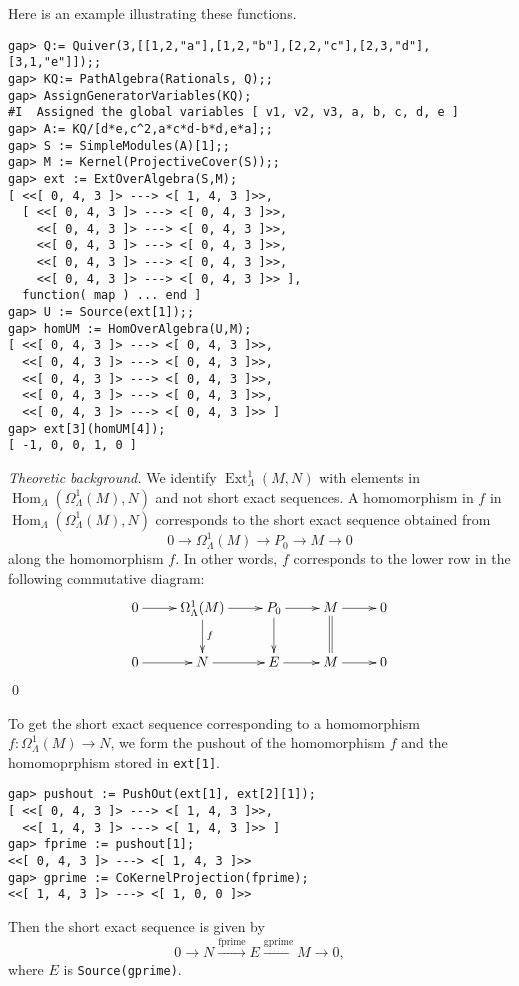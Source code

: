 \documentclass{amsart}
\newcommand{\Hom}{\operatorname{Hom}\nolimits}
\newcommand{\Ext}{\operatorname{Ext}\nolimits}
\theoremstyle{definition}
\newcommand{\code}[1]{\texttt{#1}}
\theoremstyle{theoretic}
\newenvironment{theoback}
{\medskip\small\textit{Theoretic background.} }
{\qed\par\medskip}
\begin{document}
Here is an example illustrating these functions.

\begin{verbatim}
gap> Q:= Quiver(3,[[1,2,"a"],[1,2,"b"],[2,2,"c"],[2,3,"d"],
[3,1,"e"]]);;
gap> KQ:= PathAlgebra(Rationals, Q);;
gap> AssignGeneratorVariables(KQ);
#I  Assigned the global variables [ v1, v2, v3, a, b, c, d, e ]
gap> A:= KQ/[d*e,c^2,a*c*d-b*d,e*a];;
gap> S := SimpleModules(A)[1];;
gap> M := Kernel(ProjectiveCover(S));;
gap> ext := ExtOverAlgebra(S,M);
[ <<[ 0, 4, 3 ]> ---> <[ 1, 4, 3 ]>>, 
  [ <<[ 0, 4, 3 ]> ---> <[ 0, 4, 3 ]>>,
    <<[ 0, 4, 3 ]> ---> <[ 0, 4, 3 ]>>, 
    <<[ 0, 4, 3 ]> ---> <[ 0, 4, 3 ]>>,
    <<[ 0, 4, 3 ]> ---> <[ 0, 4, 3 ]>>, 
    <<[ 0, 4, 3 ]> ---> <[ 0, 4, 3 ]>> ],
  function( map ) ... end ]
gap> U := Source(ext[1]);;
gap> homUM := HomOverAlgebra(U,M);
[ <<[ 0, 4, 3 ]> ---> <[ 0, 4, 3 ]>>,
  <<[ 0, 4, 3 ]> ---> <[ 0, 4, 3 ]>>, 
  <<[ 0, 4, 3 ]> ---> <[ 0, 4, 3 ]>>,
  <<[ 0, 4, 3 ]> ---> <[ 0, 4, 3 ]>>, 
  <<[ 0, 4, 3 ]> ---> <[ 0, 4, 3 ]>> ]
gap> ext[3](homUM[4]);
[ -1, 0, 0, 1, 0 ]
\end{verbatim}

\begin{theoback}
We identify $\Ext^1_\Lambda(M,N)$ with elements in
$\Hom_\Lambda(\Omega^1_\Lambda(M),N)$ and not short exact sequences.
A homomorphism in $f$ in $\Hom_\Lambda(\Omega^1_\Lambda(M),N)$
corresponds to the short exact sequence obtained from 
\[0\to \Omega^1_\Lambda(M)\to P_0 \to M\to 0\]
along the homomorphism $f$.  In other words, $f$ corresponds to the
lower row in the following commutative diagram:
\[\xymatrix{
0\ar[r] & \Omega^1_\Lambda(M)\ar[r]\ar[d]^f & P_0\ar[r]\ar[d] &
M\ar[r]\ar@{=}[d] & 0\\
0\ar[r] & N \ar[r] & E\ar[r] & M\ar[r] & 0
}\]
\end{theoback}
To get the short exact sequence corresponding to a homomorphism
$f\colon \Omega^1_\Lambda(M)\to N$, we form the pushout of the
homomorphism $f$ and the homomoprphism stored in \code{ext[1]}. 
\begin{verbatim}
gap> pushout := PushOut(ext[1], ext[2][1]);
[ <<[ 0, 4, 3 ]> ---> <[ 1, 4, 3 ]>>,
  <<[ 1, 4, 3 ]> ---> <[ 1, 4, 3 ]>> ]
gap> fprime := pushout[1];     
<<[ 0, 4, 3 ]> ---> <[ 1, 4, 3 ]>>
gap> gprime := CoKernelProjection(fprime); 
<<[ 1, 4, 3 ]> ---> <[ 1, 0, 0 ]>>
\end{verbatim}
Then the short exact sequence is given by 
\[0\to N\xrightarrow{\textrm{fprime}} E\xrightarrow{\textrm{gprime}}
M\to 0,\]
where $E$ is \code{Source(gprime)}.  
\end{document}
